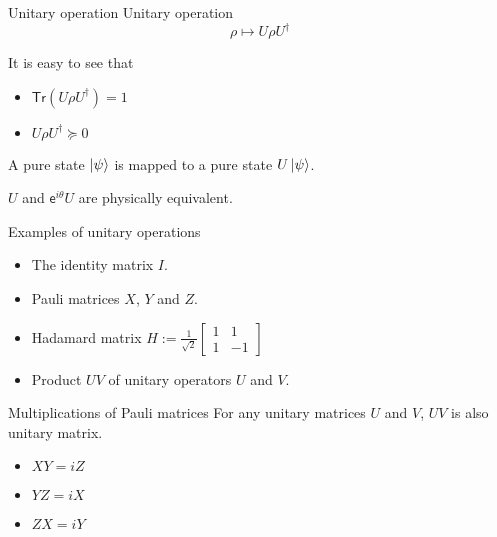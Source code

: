 \documentclass{beamer}
\newcommand{\Tr}{\mathsf{Tr}}
\begin{document}
\begin{frame}{Unitary operation}
Unitary operation
\begin{equation*}
\rho\mapsto U\rho U^\dagger
\end{equation*}

\vspace{2em}
It is easy to see that
\begin{itemize}
\item $\Tr(U\rho U^\dagger)=1$
\item $U\rho U^\dagger\succeq 0$
\end{itemize}

\vspace{3em}
A pure state $\ket{\psi}$ is mapped to a pure state $U\ket{\psi}$.

\vspace{2em}
$U$ and $\mathsf{e}^{i\theta}U$ are physically equivalent.
\end{frame}

\begin{frame}{Examples of unitary operations}
\begin{itemize}
\setlength{\itemsep}{2em}
\item The identity matrix $I$.
\item Pauli matrices $X$, $Y$ and $Z$.
\item Hadamard matrix $H:=\frac1{\sqrt{2}}\begin{bmatrix}1&1\\1&-1\end{bmatrix}$
\item Product $UV$ of unitary operators $U$ and $V$.
\end{itemize}
\end{frame}

\begin{frame}{Multiplications of Pauli matrices}
For any unitary matrices $U$ and $V$, $UV$ is also unitary matrix.

\vspace{2em}
\begin{itemize}
\setlength{\itemsep}{2em}
\item $XY=iZ$
\item $YZ=iX$
\item $ZX=iY$
\end{itemize}
\end{frame}
\end{document}
